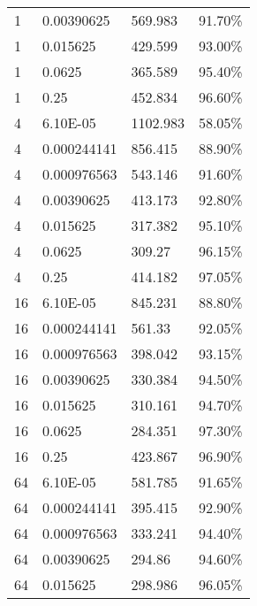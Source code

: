 \documentclass[12pt]{article}
\begin{document}
\begin{Answer}
\begin{table}[]
\begin{tabular}{llll}
1        & 0.00390625  & 569.983  & 91.70\%  \\
1        & 0.015625    & 429.599  & 93.00\%  \\
1        & 0.0625      & 365.589  & 95.40\%  \\
1        & 0.25        & 452.834  & 96.60\%  \\
4        & 6.10E-05    & 1102.983 & 58.05\%  \\
4        & 0.000244141 & 856.415  & 88.90\%  \\
4        & 0.000976563 & 543.146  & 91.60\%  \\
4        & 0.00390625  & 413.173  & 92.80\%  \\
4        & 0.015625    & 317.382  & 95.10\%  \\
4        & 0.0625      & 309.27   & 96.15\%  \\
4        & 0.25        & 414.182  & 97.05\%  \\
16       & 6.10E-05    & 845.231  & 88.80\%  \\
16       & 0.000244141 & 561.33   & 92.05\%  \\
16       & 0.000976563 & 398.042  & 93.15\%  \\
16       & 0.00390625  & 330.384  & 94.50\%  \\
16       & 0.015625    & 310.161  & 94.70\%  \\
16       & 0.0625      & 284.351  & 97.30\%  \\
16       & 0.25        & 423.867  & 96.90\%  \\
64       & 6.10E-05    & 581.785  & 91.65\%  \\
64       & 0.000244141 & 395.415  & 92.90\%  \\
64       & 0.000976563 & 333.241  & 94.40\%  \\
64       & 0.00390625  & 294.86   & 94.60\%  \\
64       & 0.015625    & 298.986  & 96.05\%  \\

\end{tabular}
\end{table}\\
\clearpage


\end{Answer}
\end{document}
